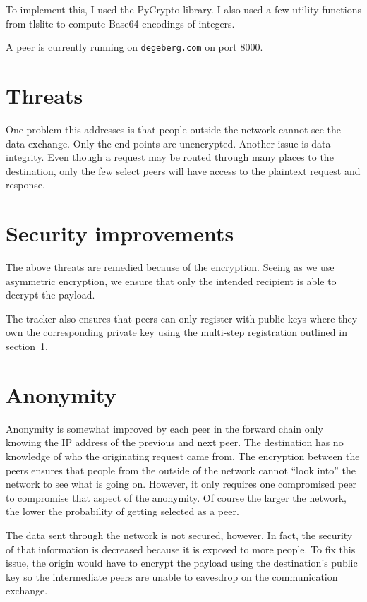 \documentclass{sig-alternate}
\begin{document}
To implement this, I used the PyCrypto library. I also used a few utility
functions from tlslite to compute Base64 encodings of integers.

A peer is currently running on \verb+degeberg.com+ on port 8000.


\section{Threats}

One problem this addresses is that people outside the network cannot see the
data exchange. Only the end points are unencrypted. Another issue is data
integrity. Even though a request may be routed through many places to the
destination, only the few select peers will have access to the plaintext
request and response.


\section{Security improvements}

The above threats are remedied because of the encryption. Seeing as we use
asymmetric encryption, we ensure that only the intended recipient is able to
decrypt the payload.

The tracker also ensures that peers can only register with public keys where
they own the corresponding private key using the multi-step registration
outlined in section~1.



\section{Anonymity}

Anonymity is somewhat improved by each peer in the forward chain only knowing
the IP address of the previous and next peer. The destination has no knowledge
of who the originating request came from. The encryption between the peers
ensures that people from the outside of the network cannot ``look into'' the
network to see what is going on. However, it only requires one compromised
peer to compromise that aspect of the anonymity. Of course the larger the
network, the lower the probability of getting selected as a peer.

The data sent through the network is not secured, however. In fact, the
security of that information is decreased because it is exposed to more
people. To fix this issue, the origin would have to encrypt the payload using
the destination's public key so the intermediate peers are unable to eavesdrop
on the communication exchange.
\end{document}
